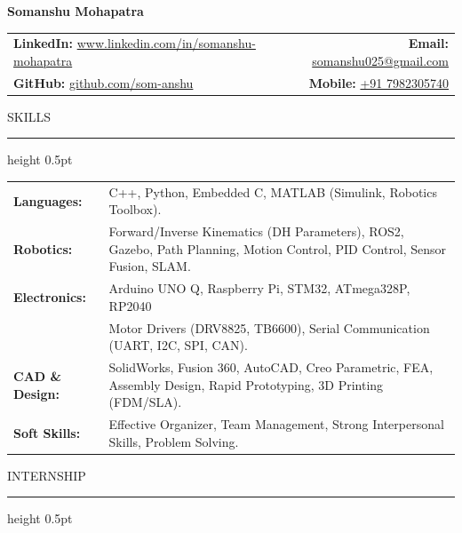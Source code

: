 \documentclass[10pt,a4paper]{article}
\newcommand{\resumeheading}[1]{
    \vspace{6pt}
    {\large\color{resblue} #1}
    \vspace{1pt}
    {\color{resblue}\hrule height 0.5pt}
    \vspace{4pt}
}
\begin{document}
{\LARGE\textbf{\color{resblue} Somanshu Mohapatra}}
\vspace{3pt}

\begin{tabularx}{\textwidth}{@{}X r@{}}
\textbf{LinkedIn:} \href{https://linkedin.com/in/som-anshu}{www.linkedin.com/in/somanshu-mohapatra} & \textbf{Email:} \href{mailto:somanshu025@gmail.com}{somanshu025@gmail.com} \\
\textbf{GitHub:} \href{https://github.com/som-anshu}{github.com/som-anshu} & \textbf{Mobile:} \href{tel:+917982305740}{+91 7982305740}
\end{tabularx}

\resumeheading{SKILLS}

\begin{tabularx}{\textwidth}{@{}p{3.0cm} X@{}}
    \textbf{\color{resblue} Languages:} & C++, Python, Embedded C, MATLAB (Simulink, Robotics Toolbox). \\
    \textbf{\color{resblue} Robotics:} & Forward/Inverse Kinematics (DH Parameters), ROS2, Gazebo, Path Planning, Motion Control, PID Control, Sensor Fusion, SLAM. \\
    \textbf{\color{resblue} Electronics:} & Arduino UNO Q, Raspberry Pi, STM32, ATmega328P, RP2040 \\
    & Motor Drivers (DRV8825, TB6600), Serial Communication (UART, I2C, SPI, CAN). \\
    \textbf{\color{resblue} CAD \& Design:} & SolidWorks, Fusion 360, AutoCAD, Creo Parametric, FEA, Assembly Design, Rapid Prototyping, 3D Printing (FDM/SLA). \\
    \textbf{\color{resblue} Soft Skills:} & Effective Organizer, Team Management, Strong Interpersonal Skills, Problem Solving.
\end{tabularx}

\resumeheading{INTERNSHIP}
\end{document}
